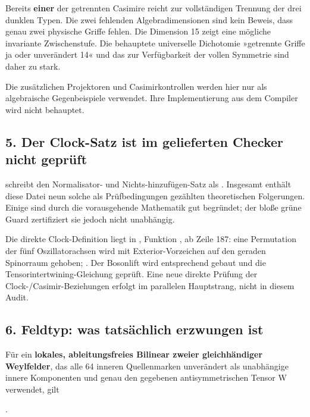 Bereits \textbf{einer} der getrennten Casimire reicht zur vollständigen
Trennung der drei dunklen Typen. Die zwei fehlenden Algebradimensionen
sind kein Beweis, dass genau zwei physische Griffe fehlen. Die Dimension
15 zeigt eine mögliche invariante Zwischenstufe. Die behauptete
universelle Dichotomie »getrennte Griffe ja oder unverändert 14« und das
 zur Verfügbarkeit der vollen Symmetrie sind
daher zu stark.

Die zusätzlichen Projektoren und Casimirkontrollen werden hier nur als
algebraische Gegenbeispiele verwendet. Ihre Implementierung aus dem
Compiler wird nicht behauptet.

\subsection{5. Der Clock-Satz ist im gelieferten Checker nicht
geprüft}\label{der-clock-satz-ist-im-gelieferten-checker-nicht-gepruxfcft}

 schreibt den Normalisator- und
Nichts-hinzufügen-Satz als . Insgesamt enthält
diese Datei neun solche als Prüfbedingungen gezählten theoretischen
Folgerungen. Einige sind durch die vorausgehende Mathematik gut
begründet; der bloße grüne Guard zertifiziert sie jedoch nicht
unabhängig.

Die direkte Clock-Definition liegt in
,
Funktion , ab Zeile 187: eine Permutation der fünf
Oszillatorachsen wird mit Exterior-Vorzeichen auf den geraden Spinorraum
gehoben; . Der Bosonlift wird entsprechend gebaut
und die Tensorintertwining-Gleichung geprüft. Eine neue direkte Prüfung
der Clock-/Casimir-Beziehungen erfolgt im parallelen Hauptstrang, nicht
in diesem Audit.

\subsection{6. Feldtyp: was tatsächlich erzwungen
ist}\label{feldtyp-was-tatsuxe4chlich-erzwungen-ist}

Für ein \textbf{lokales, ableitungsfreies Bilinear zweier gleichhändiger
Weylfelder}, das alle 64 inneren Quellenmarken unverändert als
unabhängige innere Komponenten und genau den gegebenen antisymmetrischen
Tensor W verwendet, gilt

.

